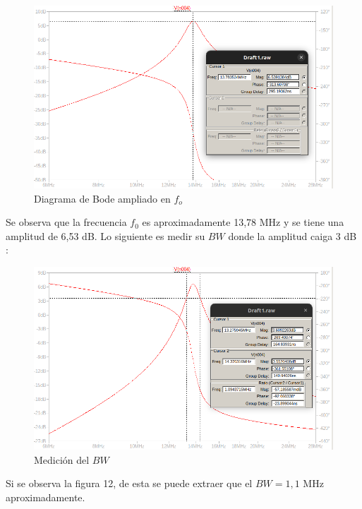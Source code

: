 \newpage
\begin{figure}[!h]
    \centering
    \includegraphics[scale=0.4]{Imagenes/dbzoom.png}
    \caption{Diagrama de Bode ampliado en \(f_o\)}
    \label{fig:Circteo2}
\end{figure}
Se observa que la frecuencia \(f_0\) es aproximadamente 13,78 MHz y se tiene una amplitud de 6,53 dB. Lo siguiente es medir su \(BW\) donde la amplitud caiga 3 dB :
\begin{figure}[!h]
    \centering
    \includegraphics[scale=0.4]{Imagenes/BW.png}
    \caption{Medición del \(BW\)}
    \label{fig:bw}
\end{figure}

Si se observa la figura 12, de esta se puede extraer que el \(BW = 1,1\) MHz aproximadamente. 
\newpage
